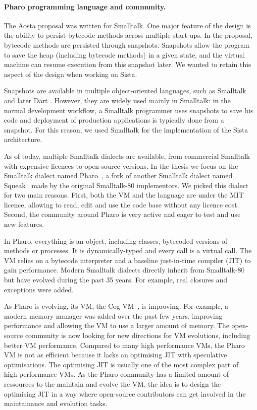 \documentclass[a4paper,12pt,twoside]{../includes/ThesisStyle}
\begin{document}
\paragraph{Pharo programming language and community.}

The Aosta proposal was written for Smalltalk. One major feature of the design is the ability to persist bytecode methods across multiple start-ups. In the proposal, bytecode methods are persisted through snapshots: Snapshots allow the program to save the heap (including bytecode methods) in a given state, and the virtual machine can resume execution from this snapshot later. We wanted to retain this aspect of the design when working on Sista.

Snapshots are available in multiple object-oriented languages, such as Smalltalk and later Dart \cite{Anna13a}. However, they are widely used mainly in Smalltalk: in the normal development workflow, a Smalltalk programmer uses snapshots to save his code and deployment of production applications is typically done from a snapshot. For this reason, we used Smalltalk for the implementation of the Sista architecture.

As of today, multiple Smalltalk dialects are available, from commercial Smalltalk with expensive licences to open-source versions. In the thesis we focus on the Smalltalk dialect named Pharo~\cite{Blac09a}, a fork of another Smalltalk dialect named Squeak~\cite{Blac07a} made by the original Smalltalk-80 implementors. We picked this dialect for two main reasons. First, both the VM and the language are under the MIT licence, allowing to read, edit and use the code base without any licence cost. Second, the community around Pharo is very active and eager to test and use new features.

In Pharo, everything is an object, including classes, bytecoded versions of methods or processes. It is dynamically-typed and every call is a virtual call. The VM relies on a bytecode interpreter and a baseline just-in-time compiler (JIT) to gain performance. Modern Smalltalk dialects directly inherit from Smalltalk-80~\cite{Gold83a} but have evolved during the past 35 years. For example, real closures and exceptions were added.

As Pharo is evolving, its VM, the Cog VM~\cite{Mira08a}, is improving. For example, a modern memory manager was added over the past few years, improving performance and allowing the VM to use a larger amount of memory. The open-source community is now looking for new directions for VM evolutions, including better VM performance. Compared to many high performance VMs, the Pharo VM is not as efficient because it lacks an optimising JIT with speculative optimisations. The optimising JIT is usually one of the most complex part of high performance VMs. As the Pharo community has a limited amount of ressources to the maintain and evolve the VM, the idea is to design the optimising JIT in a way where open-source contributors can get involved in the maintainance and evolution tasks.
\end{document}
